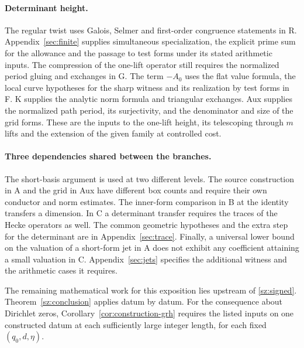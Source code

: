 \paragraph{Determinant height.}
The regular twist uses Galois, Selmer and first-order congruence statements
in R. Appendix~\ref{sec:finite} supplies simultaneous specialization,
the explicit prime sum for the allowance and the passage to test forms
under its stated arithmetic inputs. The compression of the one-lift
operator still requires the normalized period gluing and exchanges in G.
The term $-A_0$ uses the flat value formula, the local curve hypotheses for the sharp witness and
its realization by test forms in F. K supplies the analytic norm formula
and triangular exchanges. Aux supplies the normalized path period, its
surjectivity, and the denominator and size of the grid forms. These are
the inputs to the one-lift height, its telescoping through $m$ lifts and
the extension of the given family at controlled cost.

\paragraph{Three dependencies shared between the branches.}
The short-basis argument is used at two different levels. The source
construction in A and the grid in Aux have different box counts and
require their own conductor and norm estimates. The inner-form comparison
in B at the identity transfers a dimension. In C a determinant transfer
requires the traces of the Hecke operators as well. The common geometric
hypotheses and the extra step for the determinant are in
Appendix~\ref{sec:trace}. Finally, a universal lower bound on the
valuation of a short-form jet in A does not exhibit any coefficient
attaining a small valuation in C. Appendix~\ref{sec:jets} specifies the
additional witness and the arithmetic cases it requires.

The remaining
mathematical work for this exposition lies upstream of \eqref{sz:signed}.
Theorem~\ref{sz:conclusion} applies datum by datum.
For the consequence about Dirichlet zeros, Corollary~\ref{cor:construction-grh}
requires the listed inputs on one constructed datum at each sufficiently
large integer length, for each fixed $(q_0,d,\eta)$.
